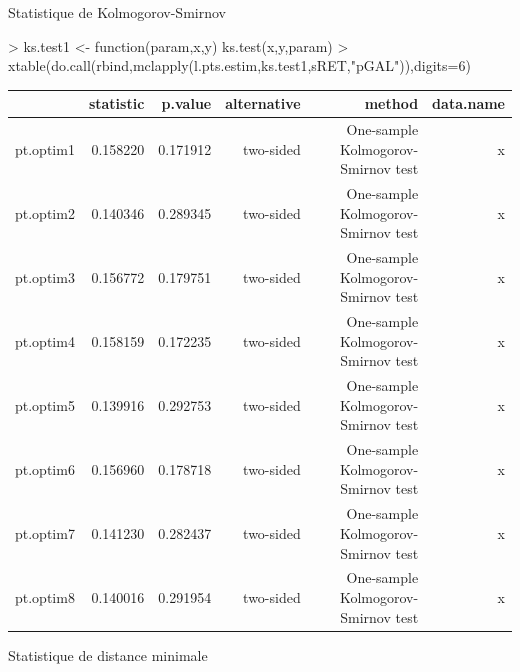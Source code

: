 \documentclass{report}
\begin{document}
Statistique de Kolmogorov-Smirnov
\begin{Schunk}
\begin{Sinput}
> 	ks.test1 <- function(param,x,y) ks.test(x,y,param)
> 	xtable(do.call(rbind,mclapply(l.pts.estim,ks.test1,sRET,"pGAL")),digits=6)
\end{Sinput}
\begin{table}[ht]
\centering
\begin{tabular}{rrrrrr}
  \hline
 & statistic & p.value & alternative & method & data.name \\ 
  \hline
pt.optim1 & 0.158220 & 0.171912 & two-sided & One-sample Kolmogorov-Smirnov test & x \\ 
  pt.optim2 & 0.140346 & 0.289345 & two-sided & One-sample Kolmogorov-Smirnov test & x \\ 
  pt.optim3 & 0.156772 & 0.179751 & two-sided & One-sample Kolmogorov-Smirnov test & x \\ 
  pt.optim4 & 0.158159 & 0.172235 & two-sided & One-sample Kolmogorov-Smirnov test & x \\ 
  pt.optim5 & 0.139916 & 0.292753 & two-sided & One-sample Kolmogorov-Smirnov test & x \\ 
  pt.optim6 & 0.156960 & 0.178718 & two-sided & One-sample Kolmogorov-Smirnov test & x \\ 
  pt.optim7 & 0.141230 & 0.282437 & two-sided & One-sample Kolmogorov-Smirnov test & x \\ 
  pt.optim8 & 0.140016 & 0.291954 & two-sided & One-sample Kolmogorov-Smirnov test & x \\ 
   \hline
\end{tabular}
\end{table}\end{Schunk}

Statistique de distance minimale
\end{document}
